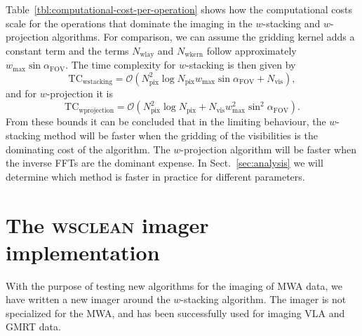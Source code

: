 \documentclass[useAMS,usenatbib]{mn2e}
\begin{document}
Table~\ref{tbl:computational-cost-per-operation} shows how the computational costs scale for the operations that dominate the imaging in the $w$-stacking and $w$-projection algorithms. For comparison, we can assume the gridding kernel adds a constant term and the terms $N_\textrm{wlay}$ and $N_\textrm{wkern}$ follow approximately $w_{\max} \sin \alpha_\textrm{FOV}$. The time complexity for $w$-stacking is then given by
\begin{equation}
\textrm{TC}_\textrm{wstacking}=\mathcal{O}\left(N^2_\textrm{pix} \log N_\textrm{pix} w_{\max} \sin \alpha_\textrm{FOV}+ N_\textrm{vis} \right),
\end{equation}
and for $w$-projection it is
\begin{equation}
\textrm{TC}_\textrm{wprojection}=\mathcal{O}\left(N^2_\textrm{pix} \log N_\textrm{pix} + N_\textrm{vis} w_{\max}^2 \sin^2 \alpha_\textrm{FOV}\right).
\end{equation}
From these bounds it can be concluded that in the limiting behaviour, the $w$-stacking method will be faster when the gridding of the visibilities is the dominating cost of the algorithm. The $w$-projection algorithm will be faster when the inverse FFTs are the dominant expense. In Sect.~\ref{sec:analysis} we will determine which method is faster in practice for different parameters.

\section{The \textsc{wsclean} imager implementation} \label{sec:implementation}
With the purpose of testing new algorithms for the imaging of MWA data, we have written a new imager around the $w$-stacking algorithm. The imager is not specialized for the MWA, and has been successfully used for imaging VLA and GMRT data.
\end{document}
